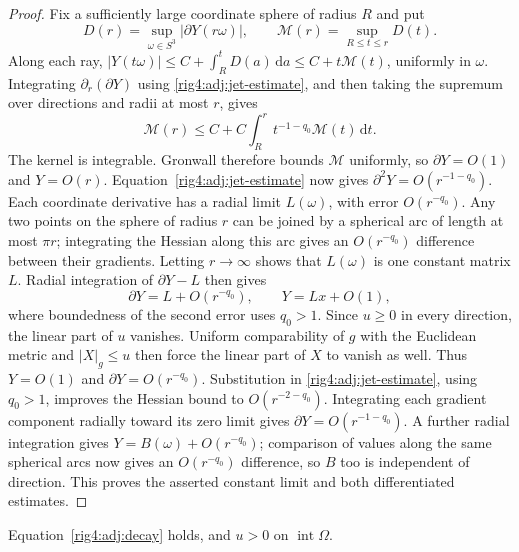 \begin{proof}
Fix a sufficiently large coordinate sphere of radius $R$ and put
\[
 D(r)=\sup_{\omega\in S^3}|\partial Y(r\omega)|,
 \qquad \mathcal M(r)=\sup_{R\le t\le r}D(t).
\]
Along each ray,
$|Y(t\omega)|\le C+\int_R^tD(a)\,\mathrm da\le C+t\mathcal M(t)$,
uniformly in $\omega$.  Integrating
$\partial_r(\partial Y)$ using \eqref{rig4:adj:jet-estimate}, and then taking
the supremum over directions and radii at most $r$, gives
\[
 \mathcal M(r)\le C+C\int_R^r t^{-1-q_0}\mathcal M(t)\,\mathrm dt.
\]
The kernel is integrable.  Gronwall therefore bounds $\mathcal M$ uniformly,
so $\partial Y=O(1)$ and $Y=O(r)$.
Equation~\eqref{rig4:adj:jet-estimate} now gives
$\partial^2Y=O(r^{-1-q_0})$.  Each coordinate derivative has a radial limit
$L(\omega)$, with error $O(r^{-q_0})$.  Any two points on the sphere of
radius $r$ can be joined by a spherical arc of length at most $\pi r$;
integrating the Hessian along this arc gives an $O(r^{-q_0})$ difference
between their gradients.  Letting $r\to\infty$ shows that $L(\omega)$ is
one constant matrix $L$.  Radial integration of $\partial Y-L$ then gives
\[
 \partial Y=L+O(r^{-q_0}),\qquad Y=Lx+O(1),
\]
where boundedness of the second error uses $q_0>1$.
Since $u\ge0$ in every direction, the linear part of $u$ vanishes.
Uniform comparability of $g$ with the Euclidean metric and $|X|_g\le u$
then force the linear part of $X$ to vanish as well.  Thus $Y=O(1)$
and $\partial Y=O(r^{-q_0})$.  Substitution in
\eqref{rig4:adj:jet-estimate}, using $q_0>1$, improves the Hessian bound to
$O(r^{-2-q_0})$.  Integrating each gradient component radially toward its
zero limit gives $\partial Y=O(r^{-1-q_0})$.  A further radial integration
gives $Y=B(\omega)+O(r^{-q_0})$; comparison of values along the same spherical
arcs now gives an $O(r^{-q_0})$ difference, so $B$ too is independent of
direction. This proves the asserted constant limit and both differentiated
estimates.
\end{proof}

\begin{lemma}
\label{rig4:adj:asymptotics}
Equation~\eqref{rig4:adj:decay} holds, and $u>0$ on
$\operatorname{int}\Omega$.
\end{lemma}

